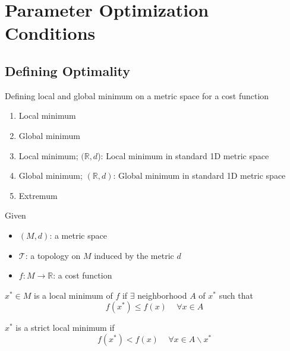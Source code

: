 \section{Parameter Optimization Conditions}

\subsection{Defining Optimality}

\begin{summary}

Defining local and global minimum on a metric space for a cost function

\begin{enumerate}
    \item Local minimum
    \item Global minimum
    \item Local minimum; $(\mathbb{R},d$): Local minimum in standard 1D metric space
    \item Global minimum; $(\mathbb{R},d)$: Global minimum in standard 1D metric space
    \item Extremum
\end{enumerate}

\end{summary}

\begin{definition}
    
    Given
    \begin{itemize}
        \item $(M,d)$: a metric space
        \item $\mathcal{T}$: a topology on $M$ induced by the metric $d$
        \item $f: M \rightarrow \mathbb{R}$: a cost function
    \end{itemize}

    $x^* \in M$ is a local minimum of $f$ if $\exists$ neighborhood $A$ of $x^*$ such that
    \begin{equation}
        f(x^*) \leq f(x)\,\quad \forall x \in A
    \end{equation}

    \begin{remark}
        $x^*$ is a strict local minimum if
        \begin{equation}
            f(x^*) < f(x)\,\quad \forall x \in A\backslash x^*
        \end{equation}
    \end{remark}

\end{definition}

